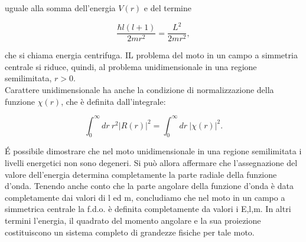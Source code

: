 uguale alla somma dell'energia $V\left(r\right)$ e del termine

\begin{equation}
\frac{\hbar l\left(l+1\right)}{2mr^2}=\frac{L^2}{2mr^2} ,
\end{equation}

che si chiama energia centrifuga. IL problema del moto in un campo a simmetria centrale si riduce, quindi, al problema unidimensionale in una regione semilimitata, $r>0$.\\
Carattere unidimensionale ha anche la condizione di normalizzazione della funzione $\chi\left(r\right)$, che è definita dall'integrale:

\begin{equation}
\int_0^\infty dr\ r^2|R\left(r\right)|^2=\int_0^\infty dr\ |\chi\left(r\right)|^2 .
\end{equation}

É possibile dimostrare che nel moto unidimensionale in una regione semilimitata i livelli energetici non sono degeneri. Si può allora affermare che l'assegnazione del valore dell'energia determina completamente la parte radiale della funzione d'onda. Tenendo anche conto che la parte angolare della funzione d'onda è data completamente dai valori di l ed m, concludiamo che nel moto in un campo a simmetrica centrale la f.d.o. è definita completamente da valori i E,l,m. In altri termini l'energia, il quadrato del momento angolare e la sua proiezione costituiscono un sistema completo di grandezze fisiche per tale moto.

